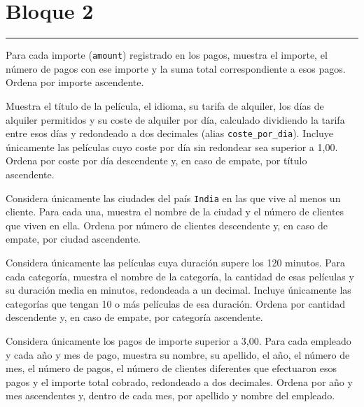 \documentclass[11pt,a4paper]{article}
\begin{document}
\section*{Bloque 2}\vspace{-3mm}\color{LBcereza}\rule{\textwidth}{0.5pt}\color{LBtexto}
\par{}\par\smallskip Para cada importe (\texttt{amount}) registrado en los pagos, muestra el importe, el número de pagos con ese importe y la suma total correspondiente a esos pagos. Ordena por importe ascendente.\par\medskip
{}\par{}\par\smallskip Muestra el título de la película, el idioma, su tarifa de alquiler, los días de alquiler permitidos y su coste de alquiler por día, calculado dividiendo la tarifa entre esos días y redondeado a dos decimales (alias \texttt{coste\_por\_dia}). Incluye únicamente las películas cuyo coste por día sin redondear sea superior a 1,00. Ordena por coste por día descendente y, en caso de empate, por título ascendente.\par\medskip
{}\par{}\par\smallskip Considera únicamente las ciudades del país \texttt{India} en las que vive al menos un cliente. Para cada una, muestra el nombre de la ciudad y el número de clientes que viven en ella. Ordena por número de clientes descendente y, en caso de empate, por ciudad ascendente.\par\medskip
{}\par{}\par\smallskip Considera únicamente las películas cuya duración supere los 120 minutos. Para cada categoría, muestra el nombre de la categoría, la cantidad de esas películas y su duración media en minutos, redondeada a un decimal. Incluye únicamente las categorías que tengan 10 o más películas de esa duración. Ordena por cantidad descendente y, en caso de empate, por categoría ascendente.\par\medskip
{}\par{}\par\smallskip Considera únicamente los pagos de importe superior a 3,00. Para cada empleado y cada año y mes de pago, muestra su nombre, su apellido, el año, el número de mes, el número de pagos, el número de clientes diferentes que efectuaron esos pagos y el importe total cobrado, redondeado a dos decimales. Ordena por año y mes ascendentes y, dentro de cada mes, por apellido y nombre del empleado.\par\medskip
\end{document}
